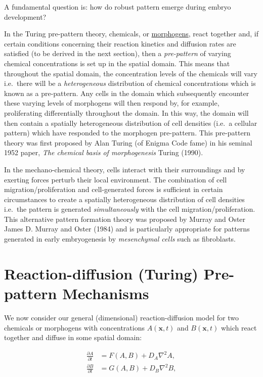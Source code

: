 \documentclass[
  letterpaper,
  DIV=11,
  numbers=noendperiod]{scrreprt}
\theoremstyle{plain}
\theoremstyle{definition}
\theoremstyle{plain}
\theoremstyle{remark}
\begin{document}
A fundamental question is: how do robust pattern emerge during embryo
development?

In the Turing pre-pattern theory, chemicals, or
\href{https://en.wikipedia.org/wiki/Morphogen}{morphogens}, react
together and, if certain conditions concerning their reaction kinetics
and diffusion rates are satisfied (to be derived in the next section),
then a \emph{pre-pattern} of varying chemical concentrations is set up
in the spatial domain. This means that throughout the spatial domain,
the concentration levels of the chemicals will vary i.e.~there will be a
\emph{heterogeneous} distribution of chemical concentrations which is
known as a pre-pattern. Any cells in the domain which subsequently
encounter these varying levels of morphogens will then respond by, for
example, proliferating differentially throughout the domain. In this
way, the domain will then contain a spatially heterogeneous distribution
of cell densities (i.e.~a cellular pattern) which have responded to the
morphogen pre-pattern. This pre-pattern theory was first proposed by
Alan Turing (of Enigma Code fame) in his seminal 1952 paper, \emph{The
chemical basis of morphogenesis} Turing (1990).

In the mechano-chemical theory, cells interact with their surroundings
and by exerting forces perturb their local environment. The combination
of cell migration/proliferation and cell-generated forces is sufficient
in certain circumstances to create a spatially heterogeneous
distribution of cell densities i.e.~the pattern is generated
\emph{simultaneously} with the cell migration/proliferation. This
alternative pattern formation theory was proposed by Murray and Oster
James D. Murray and Oster (1984) and is particularly appropriate for
patterns generated in early embryogenesis by \emph{mesenchymal cells}
such as fibroblasts.

\hypertarget{reaction-diffusion-turing-pre-pattern-mechanisms}{%
\section{Reaction-diffusion (Turing) Pre-pattern
Mechanisms}\label{reaction-diffusion-turing-pre-pattern-mechanisms}}

We now consider our general (dimensional) reaction-diffusion model for
two chemicals or morphogens with concentrations \(A({\mathbf{x}}, t)\)
and \(B({\mathbf{x}}, t)\) which react together and diffuse in some
spatial domain:

\[
\begin{aligned}
\frac{\partial A}{\partial  t} & =  F(A,B)  + D_A \nabla^2 A, \\
\frac{\partial B}{\partial  t} & =  G(A,B)  + D_B \nabla^2 B,
\end{aligned}
\]
\end{document}
